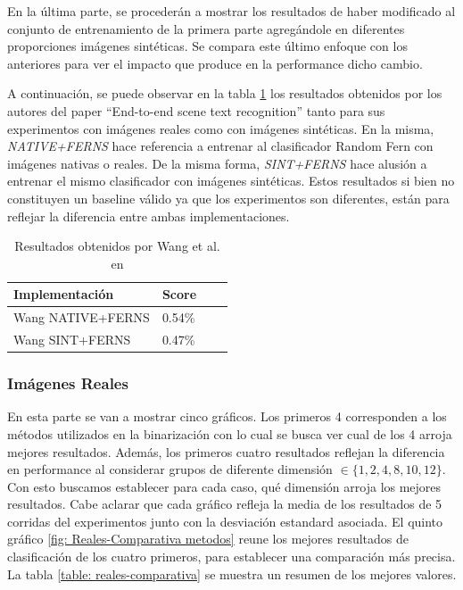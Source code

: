 	En la última parte, se procederán a mostrar los resultados de haber modificado al conjunto de entrenamiento de la primera parte agregándole en diferentes proporciones imágenes sintéticas. Se compara este último enfoque con los anteriores para ver el impacto que produce en la performance dicho cambio.
	
	A continuación, se puede observar en la tabla \ref{table: Wang paper} los resultados obtenidos por los autores del paper ``End-to-end scene text recognition'' tanto para sus experimentos con imágenes reales como con imágenes sintéticas. En la misma, \textit{NATIVE+FERNS} hace referencia a entrenar al clasificador Random Fern con imágenes nativas o reales. De la misma forma, \textit{SINT+FERNS} hace alusión a entrenar el mismo clasificador con imágenes sintéticas. Estos resultados si bien no constituyen un baseline válido ya que los experimentos son diferentes, están para reflejar la diferencia entre ambas implementaciones.
	
	\begin{table}
		\centering
	    \begin{tabular}{ | l | l | l | p{5cm} |}
    			\hline
    				\textbf{Implementación} & \textbf{Score} \\ \hline
    				Wang NATIVE+FERNS & 0.54\% \\ \hline
    				Wang SINT+FERNS & 0.47\% \\
    			\hline
    		\end{tabular}	
    		\caption[Resultados reales y sintéticas de Wang]{Resultados obtenidos por Wang et al. en \cite{wang}}
    		\label{table: Wang paper}
	\end{table}

	\subsubsection{Imágenes Reales}
	
	En esta parte se van a mostrar cinco gráficos. Los primeros 4 corresponden a los métodos utilizados en la binarización con lo cual se busca ver cual de los 4 arroja mejores resultados. Además, los primeros cuatro resultados reflejan la diferencia en performance al considerar grupos de diferente dimensión $\in \{ 1, 2, 4, 8, 10, 12\}$. Con esto buscamos establecer para cada caso, qué dimensión arroja los mejores resultados. Cabe aclarar que cada gráfico refleja la media de los resultados de 5 corridas del experimentos junto con la desviación estandard asociada. El quinto gráfico \ref{fig: Reales-Comparativa metodos} reune los mejores resultados de clasificación de los cuatro primeros, para establecer una comparación más precisa. La tabla \ref{table: reales-comparativa} se muestra un resumen de los mejores valores.
	
